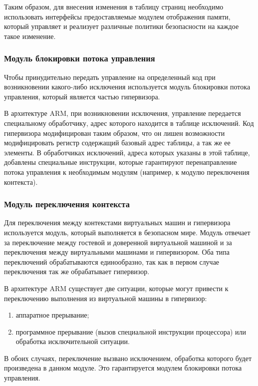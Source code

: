 Таким образом, для внесения изменения в таблицу страниц необходимо использовать интерфейсы предоставляемые модулем отображения памяти, который управляет и реализует различные политики безопасности на каждое такое изменение.

\subsubsection{Модуль блокировки потока управления}

Чтобы принудительно передать управление на определенный код при возникновении какого-либо исключения используется модуль блокировки потока управления, который является частью гипервизора.

В архитектуре ARM, при возникновении исключения, управление передается специальному обработчику, адрес которого находится в таблице исключений. Код гипервизора модифицирован таким образом, что он лишен возможности модифицировать регистр содержащий базовый адрес таблицы, а так же ее элементы. В обработчиках исключений, адреса которых указаны в этой таблице, добавлены специальные инструкции, которые гарантируют перенаправление потока управления к необходимым модулям (например, к модулю переключения контекста).

\subsubsection{Модуль переключения контекста}

Для переключения между контекстами виртуальных машин и гипервизора используется модуль, который выполняется в безопасном мире. Модуль отвечает за переключение между гостевой и доверенной виртуальной машиной и за переключения между виртуальными машинами и гипервизором. Оба типа переключений обрабатываются единообразно, так как в первом случае переключения так же обрабатывает гипервизор.

В архитектуре ARM существует две ситуации, которые могут привести к переключению выполнения из виртуальной машины в гипервизор:

\begin{enumerate}[label*=\arabic*.]
	\item аппаратное прерывание;
	\item программное прерывание (вызов специальной инструкции процессора) или обработка исключительной ситуации.
\end{enumerate}

В обоих случаях, переключение вызвано исключением, обработка которого будет произведена в данном модуле. Это гарантируется модулем блокировки потока управления.

